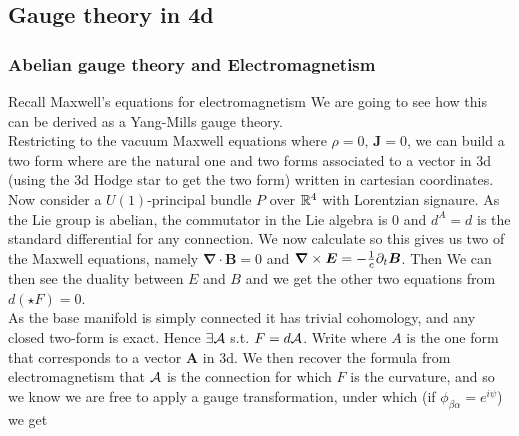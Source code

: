 \documentclass{article}
\begin{document}
\subsection{Gauge theory in 4d}
\subsubsection{Abelian gauge theory and Electromagnetism}

Recall Maxwell's equations for electromagnetism 
We are going to see how this can be derived as a Yang-Mills gauge theory. \\
Restricting to the vacuum Maxwell equations where $\rho = 0, \, \bm{J} = 0$, we can build a two form 
where 
are the natural one and two forms associated to a vector in 3d (using the 3d Hodge star to get the two form) written in cartesian coordinates. Now consider a $U(1)$-principal bundle $P$ over $\mathbb{R}^4$ with Lorentzian signaure. As the Lie group is abelian, the commutator in the Lie algebra is 0 and $d^A = d$ is the standard differential for any connection. We now calculate
so this gives us two of the Maxwell equations, namely $\bm{\nabla} \cdot \bm{B}= 0$ and $\bm{\nabla}\times \bm{E} = -\frac{1}{c} \partial_t \bm{B}$. Then
We can then see the duality between $E$ and $B$ and we get the other two equations from $d(\star F)=0$. \\
As the base manifold is simply connected it has trivial cohomology, and any closed two-form is exact. Hence $\exists \mathcal{A}$ s.t. $F = d\mathcal{A}$. Write 
where $A$ is the one form that corresponds to a vector $\bm{A}$ in 3d. We then recover the formula from electromagnetism that 
$\mathcal{A}$ is the connection for which $F$ is the curvature, and so we know we are free to apply a gauge transformation, under which (if $\phi_{\beta\alpha}=e^{i\psi}$) we get 
\end{document}

